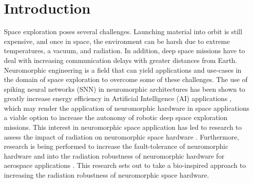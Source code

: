 \section{Introduction}\label{sec:introduction}
Space exploration poses several challenges. Launching material into orbit is still expensive, and once in space, the environment can be harsh due to extreme temperatures, a vacuum, and radiation. In addition, deep space missions have to deal with increasing communication delays with greater distances from Earth. Neuromorphic engineering is a field that can yield applications and use-cases in the domain of space exploration to overcome some of these challenges. The use of spiking neural networks (SNN) in neuromorphic architectures has been shown to greatly increase energy efficiency in Artificial Intelligence (AI) applications \cite{davies_loihi_2018}, which may render the application of neuromorphic hardware in space applications a viable option to increase the autonomy of robotic deep space exploration missions. 
This interest in neuromorphic space application has led to research to assess the impact of radiation on neuromorphic space hardware \cite{cantley_impact_2021,roffe_neutron-induced_2021}. Furthermore, research is being performed to increase the fault-tolerance of neuromorphic hardware \cite{tran_design_2011} and into the radiation robustness of neuromorphic hardware for aerospace applications \cite{vaz_cmos_2020}. This research sets out to take a bio-inspired approach to increasing the radiation robustness of neuromorphic space hardware.

